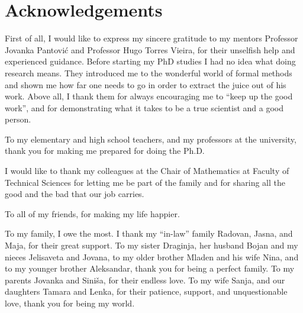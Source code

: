 \chapter*{Acknowledgements}


First of all, I would like to express my sincere gratitude to my mentors Professor Jovanka Pantovi\' c and Professor Hugo Torres Vieira, for their unselfish help and experienced guidance. Before starting my PhD studies I had no idea what doing research means. They introduced me to the wonderful world of formal methods and  shown me how far one needs to go in order to extract the juice out of his work. Above all, I thank them for always encouraging me to ``keep up the good work'', and for demonstrating what it takes to be a true scientist and a good person. 

To my elementary and high school teachers, and  my professors at the university, thank you for making me prepared for doing the Ph.D.

I would like to thank my colleagues at the Chair of Mathematics at Faculty of Technical Sciences for letting me be part of the family and for sharing all the good and the bad that our job carries. 

To all of my friends, for making my life happier.

To my family, I owe the most. I thank my ``in-law'' family Radovan, Jasna, and Maja, for their great support.
To my sister Draginja, her husband Bojan and my nieces Jelisaveta and Jovana, to my older brother Mladen and his wife Nina, and to my younger brother Aleksandar, thank you for being a perfect family. To my parents Jovanka and Sini\v sa, for their endless love. To my wife Sanja, and our daughters Tamara and Lenka, for their patience, support, and unquestionable love, thank you for being my world.
